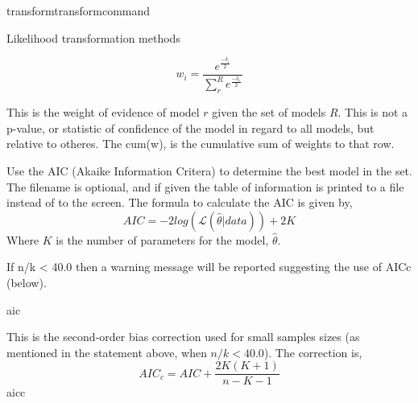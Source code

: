 \begin{command}{transform}{transformcommand}
\begin{arguments}
\begin{argumentgroup}{Likelihood transformation methods}
{                    \begin{equation*}
                        w_{i} = \frac{e^{\frac{-\delta_i}{2}}}
                                     {\sum^R_r e^{\frac{-\delta_r}{2}}}
                    \end{equation*}

                This is the weight of evidence of model $r$ given the set of
                models $R$. This is not a p-value, or statistic of confidence of
                the model in regard to all models, but relative to otheres. The
                cum(w), is the cumulative sum of weights to that row.

                \begin{description}

                        {Use the AIC (Akaike Information Critera) to determine
                        the best model in the set. The filename is optional, and
                        if given the table of information is printed to a file
                        instead of to the screen. The formula to calculate the
                        AIC is given by,
                        \begin{equation*}
                            AIC = - 2 log(\mathcal{L}(\hat{\theta}|data)) + 2 K
                        \end{equation*}
                        Where $K$ is the number of parameters for the model,
                        $\hat{\theta}$. 
                        \begin{statement}
                            If n/k < 40.0 then a warning message will be
                            reported suggesting the use of AICc (below).
                        \end{statement} }
                        {aic}

                        {This is the second-order bias correction used for small
                        samples sizes (as mentioned in the statement above, when
                        $n/k < 40.0$). The correction is,
                        \begin{equation*}
                            AIC_c = AIC + \frac{2K(K+1)} {n-K-1}
                        \end{equation*}}
                        {aicc}


\end{description}}
\end{argumentgroup}
\end{arguments}
\end{command}
